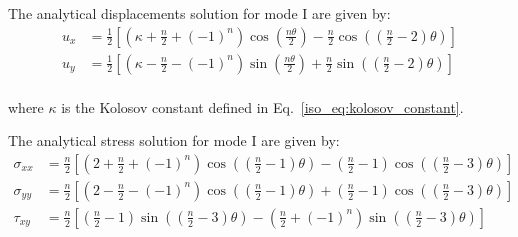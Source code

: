 The analytical displacements solution for mode \RN{1} are given by:
    \begin{subequations}
        \begin{align}
            u_x &= \frac{1}{2}\left[
                \left(
                    \kappa + \frac{n}{2} + (-1)^n
                \right) \cos \left(
                    \frac{n\theta}{2}
                \right) -
                \frac{n}{2} \cos \left(
                    \left(
                        \frac{n}{2} -2
                    \right) \theta
                \right)
            \right]\\
            u_y &= \frac{1}{2}\left[
                \left(
                    \kappa - \frac{n}{2} - (-1)^n
                \right) \sin \left(
                    \frac{n\theta}{2}
                \right) +
                \frac{n}{2} \sin \left(
                    \left(
                        \frac{n}{2} -2
                    \right) \theta
                \right)
            \right]\\
        \end{align}
    \end{subequations}

where $\kappa$ is the Kolosov constant defined in Eq.~\ref{iso_eq:kolosov_constant}.

The analytical stress solution for mode \RN{1} are given by:
    \begin{subequations}
        \begin{align}
            \sigma_{xx} &= \frac{n}{2}\left[
                \left(
                    2 + \frac{n}{2} + (-1)^n
                \right) \cos \left(
                    \left(
                        \frac{n}{2} - 1
                    \right)\theta
                \right) - \left(
                    \frac{n}{2} - 1
                \right)
                \cos \left(
                    \left(
                        \frac{n}{2} -3
                    \right) \theta
                \right)
            \right]\\
            \sigma_{yy} &= \frac{n}{2}\left[
                \left(
                    2 - \frac{n}{2} - (-1)^n
                \right) \cos \left(
                    \left(
                        \frac{n}{2} - 1
                    \right)\theta
                \right) + \left(
                    \frac{n}{2} - 1
                \right)
                \cos \left(
                    \left(
                        \frac{n}{2} -3
                    \right) \theta
                \right)
            \right]\\
            \tau_{xy} &= \frac{n}{2}\left[
                \left(
                    \frac{n}{2} - 1
                \right) \sin \left(
                    \left(
                        \frac{n}{2} - 3
                    \right)\theta
                \right) - \left(
                    \frac{n}{2} + (-1)^n
                \right)
                \sin \left(
                    \left(
                        \frac{n}{2} - 3
                    \right) \theta
                \right)
            \right]
        \end{align}
    \end{subequations}

